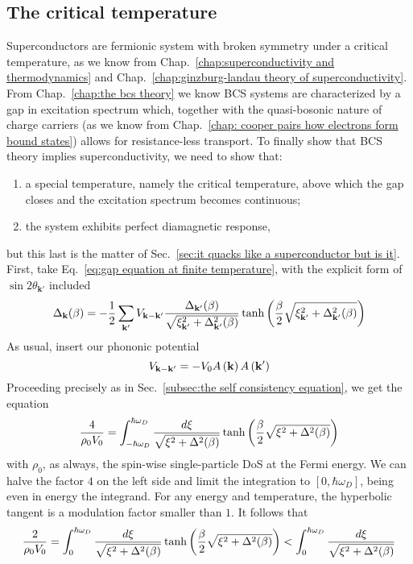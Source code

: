\subsection{The critical temperature}

Superconductors are fermionic system with broken symmetry under a critical temperature, as we know from Chap.~\ref{chap:superconductivity and thermodynamics} and Chap.~\ref{chap:ginzburg-landau theory of superconductivity}. From Chap.~\ref{chap:the bcs theory} we know BCS systems are characterized by a gap in excitation spectrum which, together with the quasi-bosonic nature of charge carriers (as we know from Chap.~\ref{chap: cooper pairs how electrons form bound states}) allows for resistance-less transport. To finally show that BCS theory implies superconductivity, we need to show that:
\begin{enumerate}
	\item a special temperature, namely the critical temperature, above which the gap closes and the excitation spectrum becomes continuous;
	\item the system exhibits perfect diamagnetic response,
\end{enumerate}
but this last is the matter of Sec.~\ref{sec:it quacks like a superconductor but is it}. First, take Eq.~\eqref{eq:gap equation at finite temperature}, with the explicit form of $\sin 2\theta_{\mathbf{k}'}$ included
\[
	\Delta_\mathbf{k} (\beta) = - \frac{1}{2} \sum_{\mathbf{k}'} V_{\mathbf{k}-\mathbf{k}'} \frac{\Delta_{\mathbf{k}'}(\beta)}{\sqrt{\xi_{\mathbf{k}'}^2 + \Delta_{\mathbf{k}'}^2 (\beta)}} \tanh \left({ \frac{\beta}{2} \sqrt{\xi_{\mathbf{k}'}^2 + \Delta_{\mathbf{k}'}^2 (\beta)} }\right)
\]
As usual, insert our phononic potential
\[
	V_{\mathbf{k}-\mathbf{k}'} = - V_0 A\left({\mathbf{k}}\right) A\left({\mathbf{k}'}\right)
\]
Proceeding precisely as in Sec.~\ref{subsec:the self consistency equation}, we get the equation
\[
	\frac{4}{\rho_0 V_0} = \int_{-\hbar\omega_D}^{\hbar\omega_D} \frac{d\xi}{\displaystyle \sqrt{\xi^2 + \Delta^2 (\beta)}} \tanh \left({ \frac{\beta}{2} \sqrt{\xi^2 + \Delta^2 (\beta)} }\right)
\]
with $\rho_0$, as always, the spin-wise single-particle DoS at the Fermi energy. We can halve the factor $4$ on the left side and limit the integration to $[0,\hbar\omega_D]$, being even in energy the integrand. For any energy and temperature, the hyperbolic tangent is a modulation factor smaller than $1$. It follows that
\[
	\frac{2}{\rho_0 V_0} = \int_0^{\hbar\omega_D} \frac{d\xi}{\displaystyle \sqrt{\xi^2 + \Delta^2 (\beta)}} \tanh \left({ \frac{\beta}{2} \sqrt{\xi^2 + \Delta^2 (\beta)} }\right) < \int_0^{\hbar\omega_D} \frac{d\xi}{\displaystyle \sqrt{\xi^2 + \Delta^2 (\beta)}}
\]

